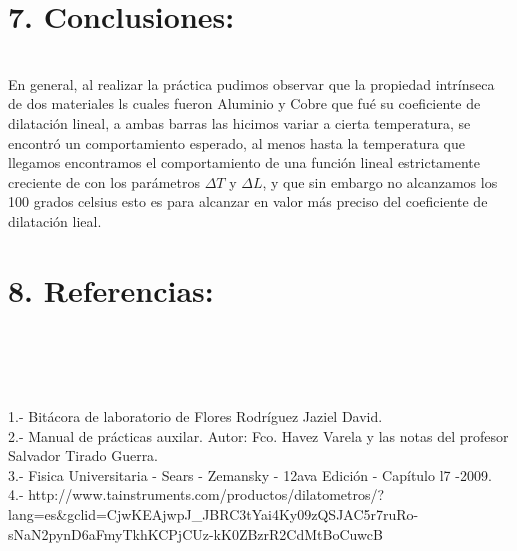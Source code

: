 \documentclass[10pt,a4paper]{article}
\begin{document}
\section*{7. Conclusiones:}\\
En general, al realizar la pr\'{a}ctica pudimos observar que la propiedad intr\'{i}nseca de dos materiales ls cuales fueron Aluminio y Cobre  que fu\'{e} su coeficiente de dilataci\'{o}n lineal, a ambas barras  las hicimos variar a cierta temperatura, se encontr\'{o} un comportamiento esperado, al menos hasta la temperatura que llegamos encontramos el comportamiento de una funci\'{o}n lineal estrictamente creciente de con los par\'{a}metros $\Delta T$ y $\Delta L$, y que sin embargo no alcanzamos los 100 grados celsius esto es para alcanzar en valor m\'{a}s preciso del coeficiente de dilataci\'{o}n lieal. 
\section*{8. Referencias:}\\
\\
\medskip
\\
\\1.- Bit\'{a}cora de laboratorio de Flores Rodr\'{i}guez Jaziel David.
\\
2.- Manual de pr\'{a}cticas auxilar. Autor: Fco. Havez Varela y las notas del profesor Salvador Tirado Guerra.
\\
3.- Fisica Universitaria - Sears - Zemansky - 12ava Edici\'{o}n - Cap\'{i}tulo l7 -2009.\\
4.- http://www.tainstruments.com/productos/dilatometros/?lang=es&gclid=CjwKEAjwpJ_JBRC3tYai4Ky09zQSJAC5r7ruRo-sNaN2pynD6aFmyTkhKCPjCUz-kK0ZBzrR2CdMtBoCuwcB \\
\end{document}
